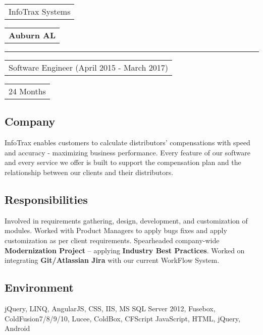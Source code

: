 \documentclass[letterpaper,11pt]{article}
\begin{document}
    \pagebreak


    \vspace{1.27cm}
    \noindent
    \begin{tabular}[t]{@{}l}
    \Large{InfoTrax Systems}
    \end{tabular}
    \hfill
    \begin{tabular}[t]{l@{}}
    \textbf{Auburn AL}
    \end{tabular}
    \noindent\rule{\textwidth}{0.5pt}
    \begin{tabular}[t]{@{}l}
    Software Engineer (April 2015 - March 2017)
    \end{tabular}
    \hfill
    \begin{tabular}[t]{l@{}}
    24 Months
    \end{tabular}

    \subsection{Company}
    InfoTrax enables customers to calculate distributors’ compensations with speed and accuracy - maximizing business performance. Every feature of our software and every service we offer is built to support the compensation plan and the relationship between our clients and their distributors.

    \subsection{Responsibilities}
    Involved in requirements gathering, design, development, and customization of modules. Worked with Product Managers to apply bugs fixes and apply customization as per client requirements. Spearheaded company-wide \textbf{Modernization Project} – applying \textbf{Industry Best Practices}. Worked on integrating \textbf{Git/Atlassian Jira} with our current WorkFlow System.

    \subsection{Environment}
    jQuery, LINQ, AngularJS, CSS, IIS, MS SQL Server 2012, Fusebox, ColdFusion7/8/9/10, Lucee, ColdBox, CFScript JavaScript, HTML, jQuery, Android

\end{document}
